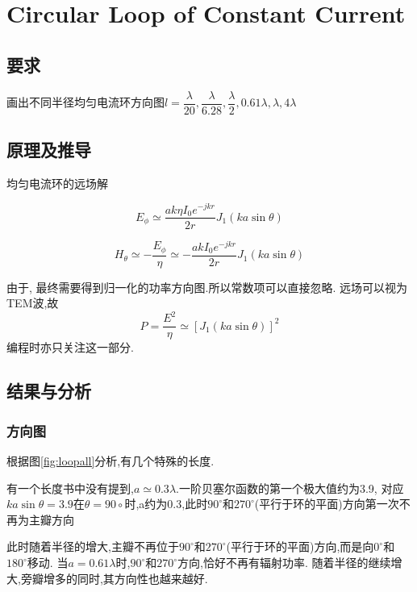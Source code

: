 

\section{Circular Loop  of Constant Current}
\subsection{要求}
\noindent 画出不同半径均匀电流环方向图$l=\dfrac{\lambda}{20},\dfrac{\lambda}{6.28},\dfrac{\lambda}{2},0.61\lambda,\lambda,4\lambda$ 

\subsection{原理及推导}
均匀电流环的远场解


\begin{equation}
E_\phi\simeq \dfrac{ak\eta I_0e^{-jkr}}{2r} J_1\left( ka\sin\theta\right)
\end{equation}


\begin{equation}
H_\theta\simeq -\dfrac{E_\phi}{\eta}
\simeq -\dfrac{ak I_0e^{-jkr}}{2r} J_1\left( ka\sin\theta\right)
\end{equation}

由于, 最终需要得到归一化的功率方向图.所以常数项可以直接忽略. 
远场可以视为TEM波,故
\begin{equation}
P=\dfrac{E^2}{\eta} \simeq \left[J_1\left( ka\sin\theta\right)\right]^2
\end{equation}
编程时亦只关注这一部分. 


\subsection{结果与分析}
\subsubsection{方向图}
根据图\ref{fig:loopall}分析,有几个特殊的长度.

有一个长度书中没有提到,$a\simeq0.3\lambda$.一阶贝塞尔函数的第一个极大值约为3.9, 对应$ka\sin\theta=3.9$在$\theta=90\circ$时,a约为0.3,此时$90^\circ$和$270^\circ$(平行于环的平面)方向第一次不再为主瓣方向

此时随着半径的增大,主瓣不再位于$90^\circ$和$270^\circ$(平行于环的平面)方向,而是向$0^\circ $和$180^\circ $移动. 当$a=0.61\lambda$时,$90^\circ$和$270^\circ$方向,恰好不再有辐射功率. 随着半径的继续增大,旁瓣增多的同时,其方向性也越来越好.


